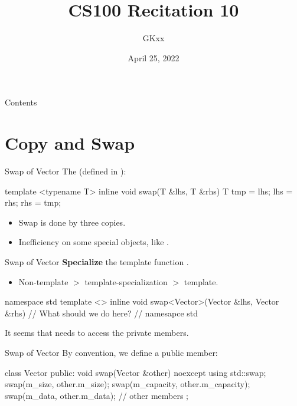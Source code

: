 \documentclass{beamer}
\title{CS100 Recitation 10}
\author{GKxx}
\date{April 25, 2022}
\begin{document}
\begin{frame}
    \maketitle
\end{frame}

\begin{frame}{Contents}
    \tableofcontents
\end{frame}

\section{Copy and Swap}

\begin{frame}[fragile]{Swap of Vector}
    The  (defined in ):
    \begin{cpp}
template <typename T>
inline void swap(T &lhs, T &rhs) {
  T tmp = lhs;
  lhs = rhs;
  rhs = tmp;
}
    \end{cpp}
    \begin{itemize}
        \item Swap is done by three copies.
        \item Inefficiency on some special objects, like .
    \end{itemize}
\end{frame}

\begin{frame}[fragile]{Swap of Vector}
    \textbf{Specialize} the template function .
    \begin{itemize}
        \item Non-template \(>\) template-specialization \(>\) template.
    \end{itemize}
    \begin{cpp}
namespace std {
template <>
inline void swap<Vector>(Vector &lhs, Vector &rhs) {
  // What should we do here?
}
} // namesapce std
    \end{cpp}
    It seems that  needs to access the private members.
\end{frame}

\begin{frame}[fragile]{Swap of Vector}
    By convention, we define a public member:
    \begin{cpp}
class Vector {
 public:
  void swap(Vector &other) noexcept {
    using std::swap;
    swap(m_size, other.m_size);
    swap(m_capacity, other.m_capacity);
    swap(m_data, other.m_data);
  }
  // other members
};
    \end{cpp}
\end{frame}
\end{document}
